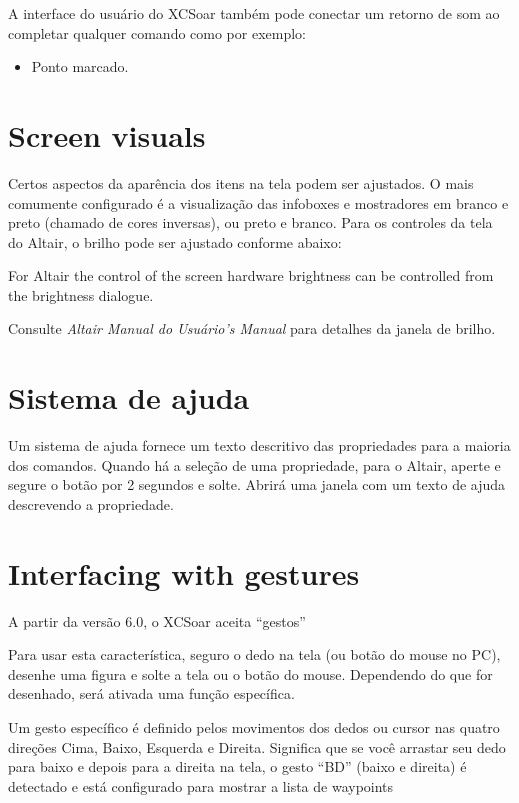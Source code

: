 A interface do usuário do XCSoar também pode conectar um retorno de som ao completar qualquer comando como por exemplo:
\begin{itemize}
\item Ponto marcado.
\end{itemize}


\section{Screen visuals}

Certos aspectos da aparência dos itens na tela podem ser ajustados.  O mais comumente configurado é a visualização das infoboxes e mostradores em branco e preto (chamado de cores inversas), ou preto e branco.
Para os controles da tela do Altair, o brilho pode ser ajustado conforme abaixo:


For Altair the control of the screen hardware 
brightness can be controlled from the brightness dialogue.
\begin{quote}
\blink{}
\end{quote}

Consulte {\em Altair Manual do Usuário's Manual} para detalhes da janela de brilho.


\section{Sistema de ajuda}

Um sistema de ajuda fornece um texto descritivo das propriedades para a maioria dos comandos.  Quando há a seleção de uma propriedade, para o Altair, aperte e segure o botão  por 2 segundos e solte. Abrirá uma janela com um texto de ajuda descrevendo a propriedade.  

\section{Interfacing with gestures}\label{sec:gestures}
A partir da versão 6.0, o XCSoar aceita “gestos”

Para usar esta característica, seguro o dedo na tela (ou botão do mouse no PC), desenhe 
uma figura e solte a tela ou o botão do mouse.  Dependendo do que for desenhado, será 
ativada uma função específica. 

Um gesto específico é definido pelos movimentos dos dedos ou cursor nas quatro direções 
Cima, Baixo, Esquerda e Direita.  Significa que se você arrastar seu dedo para baixo e 
depois para a direita na tela,  o gesto “BD” (baixo e direita) é detectado e 
está configurado para mostrar a lista de waypoints
 
